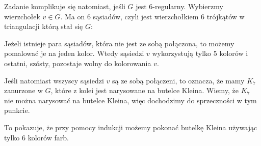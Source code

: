 \begin{enumerate}[label=\textbf{(\alph*)}]
  Zadanie komplikuje się natomiast, jeśli $G$ jest $6$-regularny. Wybierzmy wierzchołek $v\in G$. Ma on $6$ sąsiadów, czyli jest wierzchołkiem $6$ trójkątów w triangulacji którą stał się $G$:
  \begin{center}\end{center}
  Jeżeli istnieje para sąsiadów, która nie jest ze sobą połączona, to możemy pomalować je na jeden kolor. Wtedy sąsiedzi $v$ wykorzystują tylko $5$ kolorów i ostatni, szósty, pozostaje wolny do kolorowania $v$. 

  Jeśli natomiast wszyscy sąsiedzi $v$ są ze sobą połączeni, to oznacza, że mamy $K_7$ zanurzone w $G$, które z kolei jest narysowane na butelce Kleina. Wiemy, że $K_7$ nie można narysować na butelce Kleina, więc dochodzimy do sprzeczności w tym punkcie.

  To pokazuje, że przy pomocy indukcji możemy pokonać butelkę Kleina używając tylko $6$ kolorów farb.
\end{enumerate}

